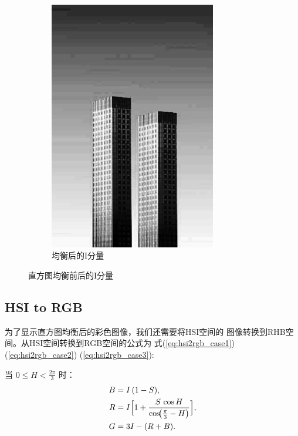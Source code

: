 \documentclass[UTF8]{article}
\begin{document}
\begin{figure}[htbp]
\begin{subfigure}{0.45\textwidth}
      \includegraphics[width=0.8\textwidth]{img/equalized_I.jpg}
      \caption{均衡后的I分量}
      \label{fig:equalized_I} %
    \end{subfigure}
    \caption{直方图均衡前后的I分量}
    \label{fig:灰度} %
\end{figure}
\subsection{HSI to RGB}
为了显示直方图均衡后的彩色图像，我们还需要将HSI空间的
图像转换到RHB空间。从HSI空间转换到RGB空间的公式为
式(\ref{eq:hsi2rgb_case1})(\ref{eq:hsi2rgb_case2})
(\ref{eq:hsi2rgb_case3}):

当 \(0 \le H < \tfrac{2\pi}{3}\) 时：
\begin{equation}\label{eq:hsi2rgb_case1}
\begin{aligned}
B &= I\,(1 - S),\\
R &= I\Bigl[1 + \frac{S\,\cos H}{\cos\!\bigl(\tfrac{\pi}{3} - H\bigr)}\Bigr],\\
G &= 3I - (R + B).
\end{aligned}
\end{equation}
\end{document}
